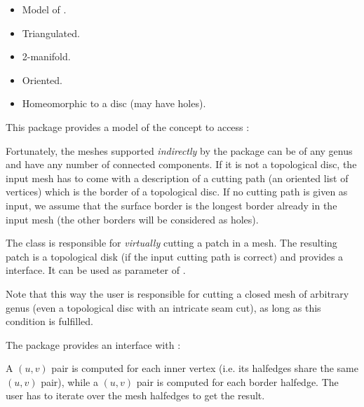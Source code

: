 \begin{itemize}

\item Model of .

\item Triangulated.

\item 2-manifold.

\item Oriented.

\item Homeomorphic to a disc (may have holes).

\end{itemize}

This package provides a model of the  concept
to access : \\

Fortunately, the meshes supported \emph{indirectly} by the package can be of any genus and
have any number of connected components. If it is not a topological
disc, the input mesh has to come with a description of a cutting path (an oriented list of
vertices) which is the border of a topological disc.  If no cutting path is
given as input, we assume that the surface border is the longest border already
in the input mesh (the other borders will be considered as holes).

The 
class is responsible for \emph{virtually} cutting
a patch in a  mesh.
The resulting patch is a topological
disk (if the input cutting path is correct)
and provides a  interface. It can be used as
parameter of .

Note that this way the user is responsible for cutting a closed mesh of
arbitrary genus (even a topological disc with an intricate seam
cut), as long as this condition is fulfilled.

The package provides an interface with : \\



A $(u,v)$ pair is computed for
each inner vertex (i.e. its halfedges share the same $(u,v)$ pair),
while a $(u,v)$ pair is computed for each border halfedge.
The user has to iterate over the mesh halfedges to get the result.



